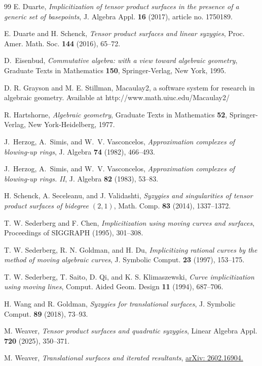 \documentclass[reqno]{amsart}
\numberwithin{equation}{section}
\theoremstyle{definition}
\begin{document}
\begin{thebibliography}{99}
 E. Duarte, \textit{Implicitization of tensor product surfaces in the presence of a generic set of basepoints}, J. Algebra Appl. \textbf{16} (2017), article no. 1750189.



 E. Duarte and H. Schenck, \textit{Tensor product surfaces and linear syzygies}, Proc. Amer. Math. Soc. \textbf{144} (2016), 65--72.



 D.~Eisenbud, \textit{Commutative algebra: with a view toward algebraic geometry}, Graduate Texts in Mathematics \textbf{150}, Springer-Verlag, New York, 1995. 


 D. R. Grayson and M. E. Stillman, Macaulay2, a software system for research in algebraic geometry. Available at http://www.math.uiuc.edu/Macaulay2/





 R. Hartshorne, \textit{Algebraic geometry}, Graduate Texts in Mathematics \textbf{52}, Springer-Verlag, New York-Heidelberg, 1977. 



 J.~Herzog, A.~Simis, and W.~V. Vasconcelos, \textit{Approximation complexes of
  blowing-up rings}, J. Algebra \textbf{74} (1982), 466--493.

 J.~Herzog, A.~Simis, and W.~V. Vasconcelos, \textit{Approximation complexes of blowing-up rings. {II}}, J. Algebra
  \textbf{82} (1983), 53--83.
  

  

 H. Schenck, A. Seceleanu, and J. Validashti, \textit{Syzygies and singularities of tensor product surfaces of bidegree $(2,1)$}, Math. Comp. \textbf{83} (2014), 1337--1372.


 T. W. Sederberg and F. Chen, \textit{Implicitization
using moving curves and surfaces}, Proceedings of
SIGGRAPH (1995), 301--308.

 T. W. Sederberg, R. N. Goldman, and H. Du, \textit{Implicitizing rational curves by the method of moving algebraic curves}, J. Symbolic Comput. \textbf{23} (1997), 153--175.

 T. W. Sederberg, T. Saito,
D. Qi, and K. S. Klimaszewski, \textit{Curve implicitization using
moving lines}, Comput. Aided Geom. Design \textbf{11} (1994),
687--706.

 H. Wang and R. Goldman, \textit{Syzygies for translational surfaces}, J. Symbolic Comput. \textbf{89} (2018), 73--93.

 M. Weaver, \textit{Tensor product surfaces and quadratic syzygies}, Linear Algebra Appl. \textbf{720} (2025), 350--371.

 M. Weaver, \textit{Translational surfaces and iterated resultants}, \href{https://arxiv.org/abs/2602.16904}{arXiv: 2602.16904.}


 
\end{thebibliography}
\end{document}
